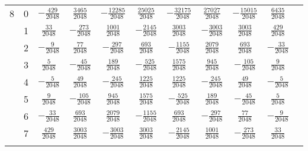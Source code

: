 \begin{table}
\begin{center}
\begin{tabular}{ccccccccccc}
      8  &  0  &  $-\frac{ 429}{ 2048}$  &  $ \frac{3465}{2048}$  &  $-\frac{12285}{2048}$  &  $ \frac{25025}{2048}$  &  $-\frac{ 32175}{ 2048}$  &  $ \frac{ 27027}{2048}$  &  $-\frac{ 15015}{2048}$  &  $ \frac{ 6435}{2048}$  \\ \addlinespace
         &  1  &  $ \frac{  33}{ 2048}$  &  $-\frac{ 273}{2048}$  &  $ \frac{ 1001}{2048}$  &  $-\frac{ 2145}{2048}$  &  $ \frac{  3003}{ 2048}$  &  $-\frac{  3003}{2048}$  &  $ \frac{  3003}{2048}$  &  $ \frac{  429}{2048}$  \\ \addlinespace
         &  2  &  $-\frac{   9}{ 2048}$  &  $ \frac{  77}{2048}$  &  $-\frac{  297}{2048}$  &  $ \frac{  693}{2048}$  &  $-\frac{  1155}{ 2048}$  &  $ \frac{  2079}{2048}$  &  $ \frac{   693}{2048}$  &  $-\frac{   33}{2048}$  \\ \addlinespace
         &  3  &  $ \frac{   5}{ 2048}$  &  $-\frac{  45}{2048}$  &  $ \frac{  189}{2048}$  &  $-\frac{  525}{2048}$  &  $ \frac{  1575}{ 2048}$  &  $ \frac{   945}{2048}$  &  $-\frac{   105}{2048}$  &  $ \frac{    9}{2048}$  \\ \addlinespace
         &  4  &  $-\frac{   5}{ 2048}$  &  $ \frac{  49}{2048}$  &  $-\frac{  245}{2048}$  &  $ \frac{ 1225}{2048}$  &  $ \frac{  1225}{ 2048}$  &  $-\frac{   245}{2048}$  &  $ \frac{    49}{2048}$  &  $-\frac{    5}{2048}$  \\ \addlinespace
         &  5  &  $ \frac{   9}{ 2048}$  &  $-\frac{ 105}{2048}$  &  $ \frac{  945}{2048}$  &  $ \frac{ 1575}{2048}$  &  $-\frac{   525}{ 2048}$  &  $ \frac{   189}{2048}$  &  $-\frac{    45}{2048}$  &  $ \frac{    5}{2048}$  \\ \addlinespace
         &  6  &  $-\frac{  33}{ 2048}$  &  $ \frac{ 693}{2048}$  &  $ \frac{ 2079}{2048}$  &  $-\frac{ 1155}{2048}$  &  $ \frac{   693}{ 2048}$  &  $-\frac{   297}{2048}$  &  $ \frac{    77}{2048}$  &  $-\frac{    9}{2048}$  \\ \addlinespace
         &  7  &  $ \frac{ 429}{ 2048}$  &  $ \frac{3003}{2048}$  &  $-\frac{ 3003}{2048}$  &  $ \frac{ 3003}{2048}$  &  $-\frac{  2145}{ 2048}$  &  $ \frac{  1001}{2048}$  &  $-\frac{   273}{2048}$  &  $ \frac{   33}{2048}$  \\ \addlinespace


\end{tabular}
\end{center}
\end{table}
